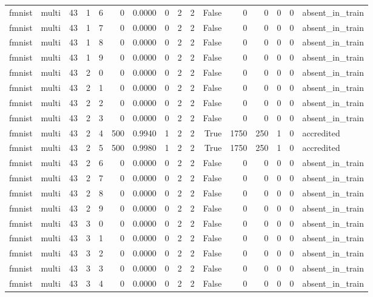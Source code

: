 \begin{tabular}{llrrrrrrrrrrrrrl}
fmnist & multi & 43 & 1 & 6 & 0 & 0.0000 & 0 & 2 & 2 & False & 0 & 0 & 0 & 0 & absent\_in\_train \\
fmnist & multi & 43 & 1 & 7 & 0 & 0.0000 & 0 & 2 & 2 & False & 0 & 0 & 0 & 0 & absent\_in\_train \\
fmnist & multi & 43 & 1 & 8 & 0 & 0.0000 & 0 & 2 & 2 & False & 0 & 0 & 0 & 0 & absent\_in\_train \\
fmnist & multi & 43 & 1 & 9 & 0 & 0.0000 & 0 & 2 & 2 & False & 0 & 0 & 0 & 0 & absent\_in\_train \\
fmnist & multi & 43 & 2 & 0 & 0 & 0.0000 & 0 & 2 & 2 & False & 0 & 0 & 0 & 0 & absent\_in\_train \\
fmnist & multi & 43 & 2 & 1 & 0 & 0.0000 & 0 & 2 & 2 & False & 0 & 0 & 0 & 0 & absent\_in\_train \\
fmnist & multi & 43 & 2 & 2 & 0 & 0.0000 & 0 & 2 & 2 & False & 0 & 0 & 0 & 0 & absent\_in\_train \\
fmnist & multi & 43 & 2 & 3 & 0 & 0.0000 & 0 & 2 & 2 & False & 0 & 0 & 0 & 0 & absent\_in\_train \\
fmnist & multi & 43 & 2 & 4 & 500 & 0.9940 & 1 & 2 & 2 & True & 1750 & 250 & 1 & 0 & accredited \\
fmnist & multi & 43 & 2 & 5 & 500 & 0.9980 & 1 & 2 & 2 & True & 1750 & 250 & 1 & 0 & accredited \\
fmnist & multi & 43 & 2 & 6 & 0 & 0.0000 & 0 & 2 & 2 & False & 0 & 0 & 0 & 0 & absent\_in\_train \\
fmnist & multi & 43 & 2 & 7 & 0 & 0.0000 & 0 & 2 & 2 & False & 0 & 0 & 0 & 0 & absent\_in\_train \\
fmnist & multi & 43 & 2 & 8 & 0 & 0.0000 & 0 & 2 & 2 & False & 0 & 0 & 0 & 0 & absent\_in\_train \\
fmnist & multi & 43 & 2 & 9 & 0 & 0.0000 & 0 & 2 & 2 & False & 0 & 0 & 0 & 0 & absent\_in\_train \\
fmnist & multi & 43 & 3 & 0 & 0 & 0.0000 & 0 & 2 & 2 & False & 0 & 0 & 0 & 0 & absent\_in\_train \\
fmnist & multi & 43 & 3 & 1 & 0 & 0.0000 & 0 & 2 & 2 & False & 0 & 0 & 0 & 0 & absent\_in\_train \\
fmnist & multi & 43 & 3 & 2 & 0 & 0.0000 & 0 & 2 & 2 & False & 0 & 0 & 0 & 0 & absent\_in\_train \\
fmnist & multi & 43 & 3 & 3 & 0 & 0.0000 & 0 & 2 & 2 & False & 0 & 0 & 0 & 0 & absent\_in\_train \\
fmnist & multi & 43 & 3 & 4 & 0 & 0.0000 & 0 & 2 & 2 & False & 0 & 0 & 0 & 0 & absent\_in\_train \\

\end{tabular}
